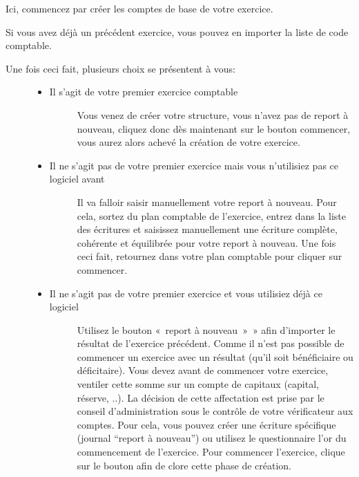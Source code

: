 \documentclass[a4paper,10pt,oneside,french]{sphinxmanual}
\begin{document}
Ici, commencez par créer les comptes de base de votre exercice.

Si vous avez déjà un précédent exercice, vous pouvez en importer la liste de code comptable.
\begin{description}
\item[{Une fois ceci fait, plusieurs choix se présentent à vous:}] \leavevmode\begin{itemize}
\item {} \begin{description}
\item[{Il s’agit de votre premier exercice comptable}] \leavevmode
Vous venez de créer votre structure, vous n’avez pas de report à nouveau, cliquez donc dès maintenant sur le bouton commencer, vous aurez alors achevé la création de votre exercice.

\end{description}

\item {} \begin{description}
\item[{Il ne s’agit pas de votre premier exercice mais vous n’utilisiez pas ce logiciel avant}] \leavevmode
Il va falloir saisir manuellement votre report à nouveau.
Pour cela, sortez du plan comptable de l’exercice, entrez dans la liste des écritures et saisissez manuellement une écriture complète, cohérente et équilibrée pour votre report à nouveau.
Une fois ceci fait, retournez dans votre plan comptable pour cliquer sur commencer.

\end{description}

\item {} \begin{description}
\item[{Il ne s’agit pas de votre premier exercice et vous utilisiez déjà ce logiciel}] \leavevmode
Utilisez le bouton « report à nouveau » » afin d’importer le résultat de l’exercice précédent.
Comme il n’est pas possible de commencer un exercice avec un résultat (qu’il soit bénéficiaire ou déficitaire).
Vous devez avant de commencer votre exercice, ventiler cette somme sur un compte de capitaux (capital, réserve, ..).
La décision de cette affectation est prise par le conseil d’administration sous le contrôle de votre vérificateur aux comptes.
Pour cela, vous pouvez créer une écriture spécifique (journal “report à nouveau”) ou utilisez le questionnaire l’or du commencement de l’exercice.
Pour commencer l’exercice, clique sur le bouton afin de clore cette phase de création.

\end{description}

\end{itemize}

\end{description}
\end{document}
